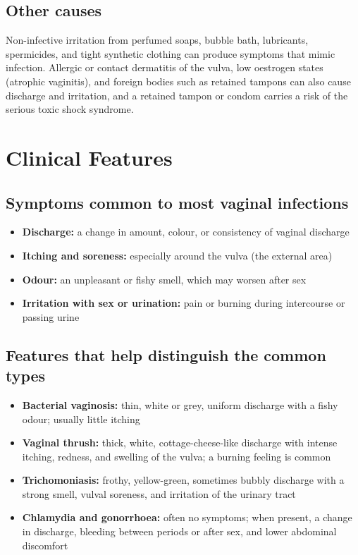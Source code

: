 \subsection*{Other causes}
Non-infective irritation from perfumed soaps, bubble bath, lubricants, spermicides, and tight synthetic clothing can produce symptoms that mimic infection. Allergic or contact dermatitis of the vulva, low oestrogen states (atrophic vaginitis), and foreign bodies such as retained tampons can also cause discharge and irritation, and a retained tampon or condom carries a risk of the serious toxic shock syndrome.

\section*{Clinical Features}
\subsection*{Symptoms common to most vaginal infections}
\begin{itemize}
    \item \textbf{Discharge:} a change in amount, colour, or consistency of vaginal discharge
    \item \textbf{Itching and soreness:} especially around the vulva (the external area)
    \item \textbf{Odour:} an unpleasant or fishy smell, which may worsen after sex
    \item \textbf{Irritation with sex or urination:} pain or burning during intercourse or passing urine
\end{itemize}

\subsection*{Features that help distinguish the common types}
\begin{itemize}
    \item \textbf{Bacterial vaginosis:} thin, white or grey, uniform discharge with a fishy odour; usually little itching
    \item \textbf{Vaginal thrush:} thick, white, cottage-cheese-like discharge with intense itching, redness, and swelling of the vulva; a burning feeling is common
    \item \textbf{Trichomoniasis:} frothy, yellow-green, sometimes bubbly discharge with a strong smell, vulval soreness, and irritation of the urinary tract
    \item \textbf{Chlamydia and gonorrhoea:} often no symptoms; when present, a change in discharge, bleeding between periods or after sex, and lower abdominal discomfort
\end{itemize}

